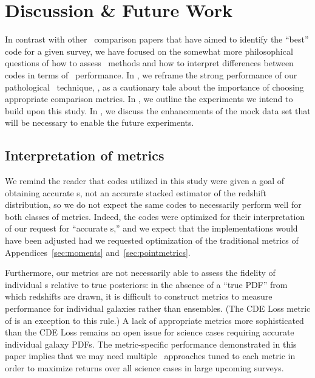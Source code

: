 \section{Discussion \& Future Work}


In contrast with other \pzpdf\ comparison papers that have aimed to identify the ``best'' code for a given survey, we have focused on the somewhat more philosophical questions of how to assess \pzpdf\ methods and how to interpret differences between codes in terms of \pzpdf\ performance.
In , we reframe the strong performance of our pathological \pzpdf\ technique, \trainz, as a cautionary tale about the importance of choosing appropriate comparison metrics.
In , we outline the experiments we intend to build upon this study.
In , we discuss the enhancements of the mock data set that will be necessary to enable the future experiments.

\subsection{Interpretation of metrics}

We remind the reader that codes utilized in this study were given a goal of obtaining accurate \pzpdf s, not an accurate stacked estimator of the redshift distribution, so we do not expect the same codes to necessarily perform well for both classes of metrics.
Indeed, the codes were optimized for their interpretation of our request for ``accurate \pzpdf s,'' and we expect that the implementations would have been adjusted had we requested optimization of the traditional metrics of Appendices~\ref{sec:moments} and~\ref{sec:pointmetrics}.

Furthermore, our metrics are not necessarily able to assess the fidelity of individual \pzpdf s relative to true posteriors: in the absence of a ``true PDF'' from which redshifts are drawn, it is difficult to construct metrics to measure performance for individual galaxies rather than ensembles.
(The CDE Loss metric of  is an exception to this rule.)%
A lack of appropriate metrics more sophisticated than the CDE Loss remains an open issue for science cases requiring accurate individual galaxy PDFs.
The metric-specific performance demonstrated in this paper implies that we may need multiple \pzpdf\ approaches tuned to each metric in order to maximize returns over all science cases in large upcoming surveys.

